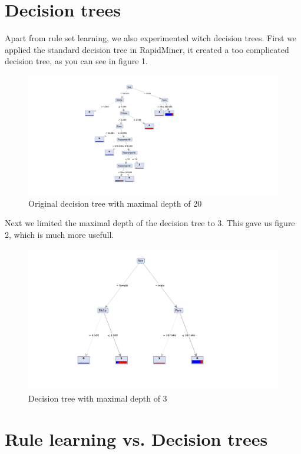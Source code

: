 \documentclass[12pt,a4paper]{article}
\begin{document}
\section{Decision trees}

Apart from rule set learning, we also experimented witch decision trees. First we applied the standard decision tree in RapidMiner, it created a too complicated decision tree, as you can see in figure 1.

\begin{figure}[H]
  \centering
  \includegraphics[width = 1.5\textwidth]{decisiontreetitanic_original.pdf}
  \caption{Original decision tree with maximal depth of 20}
\end{figure}
Next we limited the maximal depth of the decision tree to 3. This gave us figure 2, which is much more usefull.
\begin{figure}[H]
  \centering
  \includegraphics[width = 1\textwidth]{decisiontreetitanic.pdf}
  \caption{Decision tree with maximal depth of 3}
\end{figure}


\section{Rule learning vs. Decision trees}
\end{document}
